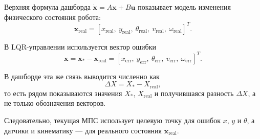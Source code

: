 \documentclass[12pt,a4paper]{article}
\newcommand{\vect}[1]{\mathbf{#1}}
\begin{document}
Верхняя формула дашборда \(\dot{\vect{x}} = A\vect{x} + B\vect{u}\)
показывает модель изменения физического состояния робота:
\[
\vect{x}_{\mathrm{real}} =
[x_{\mathrm{real}},\ y_{\mathrm{real}},\ \theta_{\mathrm{real}},\
v_{\mathrm{real}},\ \omega_{\mathrm{real}}]^T.
\]

В LQR-управлении используется вектор ошибки
\[
\vect{x} =
\vect{x}_{*} - \vect{x}_{\mathrm{real}} =
[x_{\mathrm{err}},\ y_{\mathrm{err}},\ \theta_{\mathrm{err}},\ v_{\mathrm{err}},\
\omega_{\mathrm{err}}]^T.
\]

В дашборде эта же связь выводится численно как
\[
\Delta X = X_{*} - X_{\mathrm{real}},
\]
то есть рядом показываются значения \(X_{*}\), \(X_{\mathrm{real}}\) и
получившаяся разность \(\Delta X\), а не только обозначения векторов.

Следовательно, текущая МПС использует целевую точку для ошибок \(x\), \(y\)
и \(\theta\), а датчики и кинематику — для реального состояния
\(\vect{x}_{\mathrm{real}}\).
\end{document}

